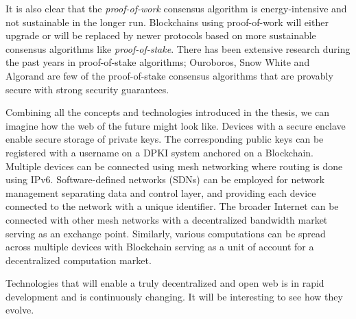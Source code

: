 It is also clear that the \textit{proof-of-work} consensus algorithm is energy-intensive and not sustainable in the longer run. Blockchains using proof-of-work will either upgrade or will be replaced by newer protocols based on more sustainable consensus algorithms like \textit{proof-of-stake}. There has been extensive research during the past years in proof-of-stake algorithms; Ouroboros\cite{kiayias2017ouroboros}, Snow White\cite{daian2017snow} and Algorand\cite{gilad2017algorand} are few of the proof-of-stake consensus algorithms that are provably secure with strong security guarantees.

Combining all the concepts and technologies introduced in the thesis, we can imagine how the web of the future might look like. Devices with a secure enclave enable secure storage of private keys. The corresponding public keys can be registered with a username on a DPKI system anchored on a Blockchain. Multiple devices can be connected using mesh networking where routing is done using IPv6. Software-defined networks (SDNs) can be employed for network management separating data and control layer, and providing each device connected to the network with a unique identifier. The broader Internet can be connected with other mesh networks with a decentralized bandwidth market serving as an exchange point. Similarly, various computations can be spread across multiple devices with Blockchain serving as a unit of account for a decentralized computation market.

Technologies that will enable a truly decentralized and open web is in rapid development and is continuously changing. It will be interesting to see how they evolve.